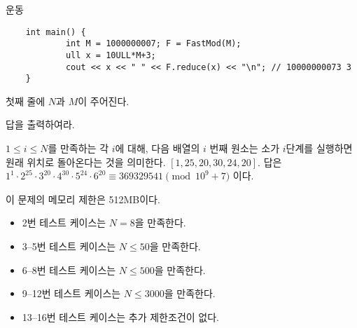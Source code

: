 \begin{problem}{운동}
\begin{verbatim}
	int main() {
	        int M = 1000000007; F = FastMod(M);
	        ull x = 10ULL*M+3; 
	        cout << x << " " << F.reduce(x) << "\n"; // 10000000073 3
	}

	\end{verbatim}
	
	
	\InputFile
	
	첫째 줄에 $N$과 $M$이 주어진다.
	
	\OutputFile
	
	답을 출력하여라.
	
	
	\Example
		
	\begin{example}
	\end{example}
	
	$1 \le i \le N$를 만족하는 각 $i$에 대해, 다음 배열의 $i$ 번째 원소는 소가 $i$단계를 실행하면 원래 위치로 돌아온다는 것을 의미한다. $[1, 25, 20, 30, 24, 20]$. 답은 $1^1 \cdot 2^{25} \cdot 3^{20} \cdot 4^{30} \cdot 5^{24} \cdot 6^{20} \equiv 369329541 \pmod{10^9+7}$ 이다.
	
	\Note
	
	이 문제의 메모리 제한은 512MB이다.
	
	\Scoring
	
	\begin{itemize}
		\item 2번 테스트 케이스는 $N = 8$을 만족한다.
		\item 3--5번 테스트 케이스는 $N \le 50$을 만족한다.
		\item 6--8번 테스트 케이스는 $N \le 500$을 만족한다.
		\item 9--12번 테스트 케이스는 $N \le 3000$을 만족한다.
		\item 13--16번 테스트 케이스는 추가 제한조건이 없다.
	\end{itemize}
	
	
	
	
\end{problem}

